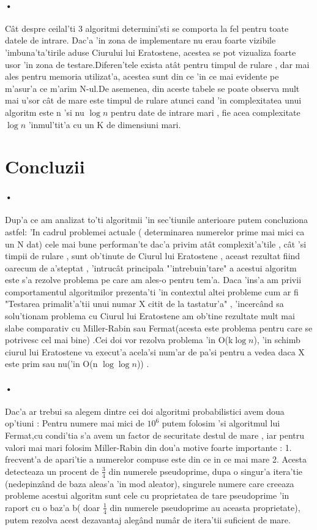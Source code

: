 \documentclass[12pt,twoside]{article}
\numberwithin{figure}{section}
\begin{document}
\paragraph{•}
C\^at despre ceilal'ti 3 algoritmi determini'sti se comporta la fel pentru toate datele de intrare. Dac'a 'in zona de implementare nu erau foarte vizibile 'imbuna'ta'tirile aduse Ciurului lui Eratostene, acestea se pot vizualiza foarte usor 'in zona de testare.Diferen'tele exista at\^at pentru timpul de rulare , dar mai ales pentru memoria utilizat'a, acestea sunt din ce 'in ce mai evidente pe m'asur'a ce m'arim N-ul.De asemenea, din aceste tabele se poate observa mult mai u'sor c\^at de mare este timpul de rulare atunci cand 'in complexitatea unui algoritm este n 'si nu $\log n$ pentru date de intrare mari , fie acea complexitate $\log n$ 'inmul'tit'a cu un K de dimensiuni mari. 

\newpage
\section{Concluzii}
\paragraph{•}
Dup'a ce am analizat to'ti algoritmii 'in sec'tiunile anterioare putem concluziona astfel: 'In cadrul problemei actuale ( determinarea numerelor prime mai mici ca un N dat) cele mai bune performan'te dac'a privim at\^at complexit'a'tile , c\^at 'si timpii de rulare , sunt ob'tinute de Ciurul lui Eratostene , aceast rezultat fiind oarecum de a'steptat , 'intruc\^at principala "'intrebuin'tare" a acestui algoritm este s'a rezolve problema pe care am ales-o pentru tem'a. Daca 'ins'a am privii comportamentul algoritmilor prezenta'ti 'in contextul altei probleme cum ar fi "Testarea primalit'a'tii unui numar X citit de la tastatur'a" , 'incerc\^and sa solu'tionam problema cu Ciurul lui Eratostene am ob'tine rezultate mult mai slabe comparativ cu Miller-Rabin sau Fermat(acesta este problema pentru care se potrivesc cel mai bine) .Cei doi  vor rezolva problema  'in O(k$\log n$), 'in schimb ciurul lui Eratostene va execut'a acela'si num'ar de pa'si pentru a vedea daca X este prim sau nu('in O(n $\log \log n$)) .
\paragraph{•}
Dac'a ar trebui sa alegem dintre cei doi algoritmi probabilistici avem doua op'tiuni : Pentru numere mai mici de $10^6$ putem folosim 'si algoritmul lui Fermat,cu condi'tia s'a avem un factor de securitate destul de mare , iar pentru valori mai mari folosim Miller-Rabin din dou'a motive foarte importante : 1. frecvent'a de apari'tie a numerelor compuse este din ce in ce mai mare 2. Acesta detecteaza un procent de $\frac{3}{4}$ din numerele pseudoprime, dupa o singur'a itera'tie (nedepinz\^and de baza aleas'a 'in mod aleator), singurele numere care creeaza probleme acestui algoritm sunt cele cu proprietatea de tare pseudoprime 'in raport cu o baz'a b( doar $\frac{1}{4}$ din numerele pseudoprime au aceasta proprietate), putem rezolva acest dezavantaj aleg\^and num\^ar de itera'tii suficient de mare. 
\end{document}
